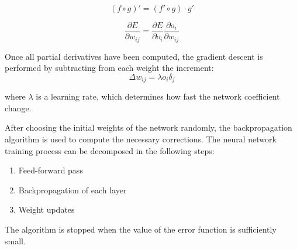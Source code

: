 \begin{equation}
(f \circ g)' = (f' \circ g) \cdot g'
\end{equation}

\begin{equation}
\frac{\partial E}{\partial w_{ij}} =  \frac{\partial E}{\partial o_{i}} \frac{\partial o_i}{\partial w_{ij}} 
\end{equation}


Once all partial derivatives have been computed, the gradient descent is performed by subtracting from each weight the increment:
\begin{equation}
\Delta w_{ij} = \lambda o_i \delta_j
\end{equation}

where $\lambda$ is a learning rate, which determines how fast the network coefficient change.

After choosing the initial weights of the network randomly, the backpropagation algorithm is used to compute the necessary corrections. The neural network training process can be decomposed in the following steps:

\begin{enumerate}
\itemsep0em 
\item Feed-forward pass
\item Backpropagation of each layer
\item Weight updates
\end{enumerate}
The algorithm is stopped when the value of the error function is sufficiently small.